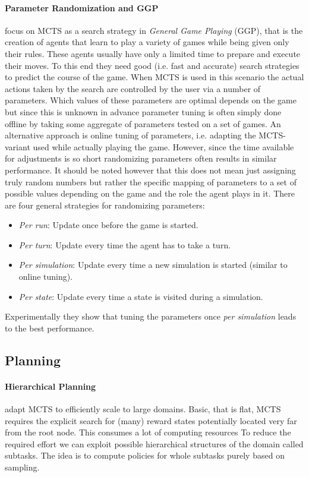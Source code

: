 \paragraph{Parameter Randomization and GGP}
\cite{sironi2019comparing} focus on MCTS as a search strategy in \textit{General Game Playing} (GGP), that is the creation of agents that learn to play a variety of games while being given only their rules. These agents usually have only a limited time to prepare and execute their moves. To this end they need good (i.e. fast and accurate) search strategies to predict the course of the game. When MCTS is used in this scenario the actual actions taken by the search are controlled by the user via a number of parameters. Which values of these parameters are optimal depends on the game but since this is unknown in advance parameter tuning is often simply done offline by taking some aggregate of parameters tested on a set of games. An alternative approach is online tuning of parameters, i.e. adapting the MCTS-variant used while actually playing the game. However, since the time available for adjustments is so short randomizing parameters often results in similar performance. It should be noted however that this does not mean just assigning truly random numbers but rather the specific mapping of parameters to a set of possible values depending on the game and the role the agent plays in it. There are four general strategies for randomizing parameters:
\begin{itemize}
    \item \textit{Per run}: Update once before the game is started.
    \item \textit{Per turn}: Update every time the agent has to take a turn.
    \item \textit{Per simulation}: Update every time a new simulation is started (similar to online tuning).
    \item \textit{Per state}: Update every time a state is visited during a simulation.
\end{itemize}
Experimentally they show that tuning the parameters once \textit{per simulation} leads to the best performance.
\subsection{Planning}
\paragraph{Hierarchical Planning}
\cite{vien2015hierarchical} adapt MCTS to efficiently scale to large domains. Basic, that is flat, MCTS requires the explicit search for (many) reward states potentially located very far from the root node. This consumes a lot of computing resources To reduce the required effort we can exploit possible hierarchical structures of the domain called subtasks. The idea is to compute policies for whole subtasks purely based on sampling.

